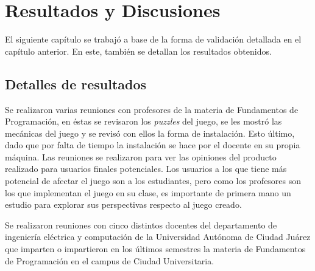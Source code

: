 \chapter{Resultados y Discusiones}
El siguiente capítulo se trabajó a base de la forma de validación detallada en el capítulo anterior. En este, también se detallan los resultados obtenidos.

\section{Detalles de resultados}
Se realizaron varias reuniones con profesores de la materia de Fundamentos de Programación, en éstas se revisaron los \textit{puzzles} del juego, se les mostró las mecánicas del juego y se revisó con ellos la forma de instalación. Esto último, dado que por falta de tiempo la instalación se hace por el docente en su propia máquina. Las reuniones se realizaron para ver las opiniones del producto realizado para usuarios finales potenciales. Los usuarios a los que tiene más potencial de afectar el juego son a los estudiantes, pero como los profesores son los que implementan el juego en su clase, es importante de primera mano un estudio para explorar sus perspectivas respecto al juego creado.

Se realizaron reuniones con cinco distintos docentes del departamento de ingeniería eléctrica y computación de la Universidad Autónoma de Ciudad Juárez que imparten o impartieron en los últimos semestres la materia de Fundamentos de Programación en el campus de Ciudad Universitaria.

